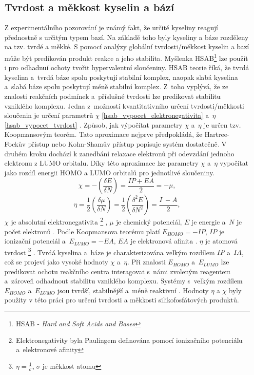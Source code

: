 \documentclass[
digital, %
table,   %
lof,     %
lot,     %
oneside,
]{fithesis3}
\begin{document}
\subsection{Tvrdost a měkkost kyselin a bází}
Z experimentálního pozorování je známý fakt, že určité kyseliny reagují přednostně s určitým typem bazí. Na základě toho byly kyseliny a báze rozděleny na tzv. tvrdé a měkké. S pomocí analýzy globální tvrdosti/měkkost kyselin a bazí může být predikován produkt reakce a jeho stabilita. Myšlenka HSAB\footnote{HSAB - \textit{Hard and Soft Acids and Bases}} lze použít i pro odhadnuí ochoty tvořit hypervalentní sloučeniny. HSAB teorie říká, že tvrdá kyselina a~tvrdá báze spolu poskytují stabilní komplex, naopak slabá kyselina a~slabá báze spolu poskytují méně stabilní komplex. Z~toho vyplývá, že ze znalosti reakčních podmínek a~příslušné tvrdosti lze predikovat stabilitu vzniklého komplexu. Jedna z~možností kvantitativního určení tvrdosti/měkkosti sloučenin je určení parametrů $\chi$ \ref{hsab_vypocet_elektronegativita} a~$\eta$ \ref{hsab_vypocet_tvrdost} \cite{hsabclanek}. Způsob, jak výpočítat parametry $\chi$ a~$\eta$ je určen tzv. Koopmansovým teorém. Tato aproximace nejprve předpokládá, že Hartree-Fockův přístup nebo Kohn-Shamův přístup popisuje systém dostatečně. V druhém kroku dochází k zanedbání relaxace elektronů při odevzdání jednoho elektronu z LUMO orbitalu. Díky této aproximace lze parametry $\chi$ a~$\eta$ vypočítat jako rozdíl energii HOMO a LUMO orbitalů pro jednotlivé sloučeniny.
\begin{equation}
\chi = - \left( \frac{\delta E}{\delta N} \right) = \frac{IP + EA}{2} = -\mu,
\label{hsab_vypocet_elektronegativita}
\end{equation}
\begin{equation}
\eta = \frac{1}{2} \left( \frac{\delta \mu}{\delta N} \right) = \frac{1}{2}\left( \frac{\delta^2 E}{\delta N^2} \right) = \frac{I~- A}{2},
\label{hsab_vypocet_tvrdost}
\end{equation}
$\chi$ je absolutní elektronegativita  \footnote{Elektronegativity byla Paulingem definována pomocí ionizačního potenciálu a~elektronové afinity} , $\mu$ je chemický potenciál, $E$ je energie a~$N$ je počet elektronů \cite{hsabwatoc}. Podle Koopmansova teorému platí $E_{HOMO} = - IP$, $IP$ je ionizační potenciál a~$E_{LUMO} = -EA$, $EA$ je elektronová afinita \cite{kratochvilexcerpta}. $\eta$ je atomová tvrdost \footnote{$\eta = \frac{1}{\sigma}$, $\sigma$ je měkkost atomu} \cite{pearson1986absolute}. Tvrdá kyselina a~báze je charakterizována velkým rozdílem $IP$ a~$IA$, což se projeví jako vysoké hodnoty $\chi$ a~$\eta$. Při znalosti $E_{HOMO}$ a~$E_{LUMO}$ lze predikovat ochotu reakčního centra interagovat s~námi zvoleným reagentem a~zároveň odhadnout stabilitu vzniklého komplexu. Systémy s~velkým rozdílem $E_{HOMO}$ a~$E_{LUMO}$ jsou tvrdší, stabilnější a~méně reaktivní \cite{hsabwatoc}. Hodnoty $\eta$ a $\chi$ byly použity v této práci pro určení tvrdosti a měkkosti silikofosfátových produktů.\\
\end{document}
